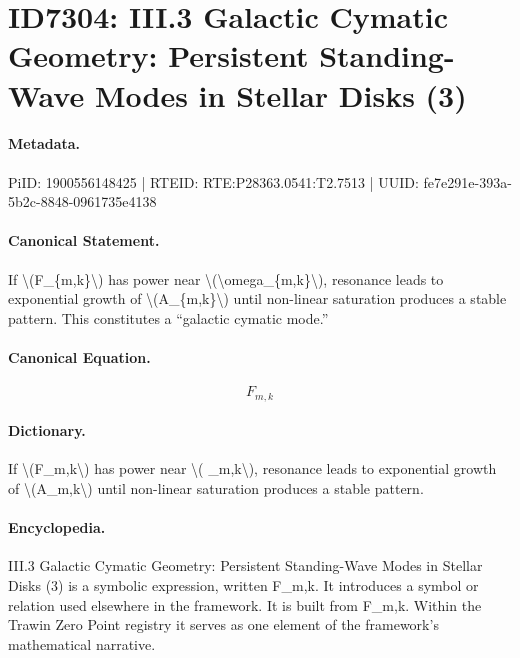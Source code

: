 \section*{ID7304: III.3 Galactic Cymatic Geometry: Persistent Standing-Wave Modes in Stellar Disks (3)}
\paragraph{Metadata.}
PiID: 1900556148425 | RTEID: RTE:P28363.0541:T2.7513 | UUID: fe7e291e-393a-5b2c-8848-0961735e4138

\paragraph{Canonical Statement.}
If \textbackslash{}(F\_\{m,k\}\textbackslash{}) has power near \textbackslash{}(\textbackslash{}omega\_\{m,k\}\textbackslash{}), resonance leads to exponential growth of \textbackslash{}(A\_\{m,k\}\textbackslash{}) until non-linear saturation produces a stable pattern. This constitutes a “galactic cymatic mode.”

\paragraph{Canonical Equation.}
\[
F_{m,k}
\]

\paragraph{Dictionary.}
If \textbackslash{}(F\_m,k\textbackslash{}) has power near \textbackslash{}( \_m,k\textbackslash{}), resonance leads to exponential growth of \textbackslash{}(A\_m,k\textbackslash{}) until non-linear saturation produces a stable pattern.

\paragraph{Encyclopedia.}
III.3 Galactic Cymatic Geometry: Persistent Standing-Wave Modes in Stellar Disks (3) is a symbolic expression, written F\_m,k. It introduces a symbol or relation used elsewhere in the framework. It is built from F\_m,k. Within the Trawin Zero Point registry it serves as one element of the framework's mathematical narrative.
